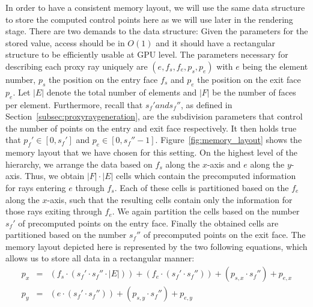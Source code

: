 \documentclass[journal]{vgtc}                %
\begin{document}
In order to have a consistent memory layout, we will use the same data structure to store the computed control points here as we will use  later in the rendering stage. There are two demands to the data structure: Given the parameters for the stored value, access should be in $O(1)$ and it should have a rectangular structure to be efficiently usable at GPU level. The parameters necessary for describing each proxy ray uniquely are $(e, f_s, f_e, p_s, p_e)$ with $e $ being the element number, $p_s$ the position on the entry face $f_s$ and $p_e$ the position on the exit face $p_e$. Let $\left|E\right|$ denote the total number of elements and $\left|F\right|$ be the number of faces per element. Furthermore, recall that $s_f' and s_f''$, as defined in Section~\ref{subsec:proxyraygeneration}, are the subdivision parameters that control the number of points on the entry and exit face respectively. It then holds true that $p_f' \in [0,s_f']$ and $p_e \in [0,s_f'' - 1]$. Figure~\ref{fig:memory_layout} shows the memory layout that we have chosen for this setting. On the highest level of the hierarchy, we arrange the data based on $f_s$ along the $x$-axis and $e$ along the $y$-axis. Thus, we obtain $\left|F\right| \cdot \left|E\right|$ cells which contain the precomputed information for rays entering $e$ through $f_s$. Each of these cells is partitioned based on the $f_e$ along the $x$-axis, such that the resulting cells contain only the information for those rays exiting through $f_e$. We again partition the cells based on the number $s_f'$ of precomputed points on the entry face. Finally the obtained cells are partitioned based on the number $s_f''$ of precomputed points on the exit face. The memory layout depicted here is represented by the two following equations, which allows us to store all data in a rectangular manner: 
\begin{eqnarray}
p_x &=& (f_s \cdot (s_f' \cdot s_f'' \cdot \left|E\right|)) +(f_e \cdot (s_f' \cdot s_f'')) + (p_{s,x} \cdot s_f'') + p_{e,x}\\
p_y &=& (e   \cdot (s_f' \cdot s_f'')) + (p_{s,y} \cdot s_f'') + p_{e,y}
\end{eqnarray}
\end{document}
